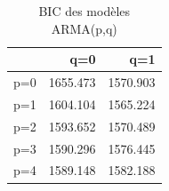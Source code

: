 \begin{table}[!h]
\centering
\caption{BIC des modèles ARMA(p,q)}
\centering
\begin{tabular}[t]{lrr}
\toprule
  & q=0 & q=1\\
\midrule
p=0 & 1655.473 & 1570.903\\
p=1 & 1604.104 & 1565.224\\
p=2 & 1593.652 & 1570.489\\
p=3 & 1590.296 & 1576.445\\
p=4 & 1589.148 & 1582.188\\
\bottomrule
\end{tabular}
\end{table}

